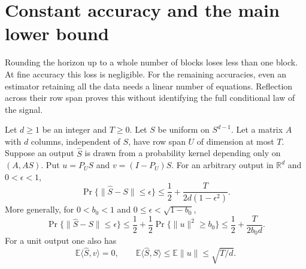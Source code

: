 \section{Constant accuracy and the main lower bound}\label{h:end:section}

Rounding the horizon up to a whole number of blocks loses less than one
block. At fine accuracy this loss is negligible. For the remaining
accuracies, even an estimator retaining all the data needs a linear
number of equations. Reflection across their row span proves this
without identifying the full conditional law of the signal.

\begin{lemma}
\label{h:ev:reflection}
Let \(d\ge1\) be an integer and \(T\ge0\). Let \(S\) be uniform on
\(S^{d-1}\). Let a matrix \(A\) with \(d\) columns, independent of
\(S\), have row span \(U\) of dimension at most \(T\). Suppose an
output \(\widehat S\) is drawn from a probability kernel depending
only on \((A,AS)\). Put \(u=P_US\) and \(v=(I-P_U)S\).
For an arbitrary output in \(\mathbb R^d\) and \(0<\epsilon<1\),
\begin{equation}\label{h:ev:direct-residual}
 \Pr\{\|\widehat S-S\|\le\epsilon\}
 \le\frac12+\frac{T}{2d(1-\epsilon^2)}.
\end{equation}
More generally, for \(0<b_0<1\) and
\(0\le\epsilon<\sqrt{1-b_0}\),
\begin{equation}\label{h:ev:antipodal}
 \Pr\{\|\widehat S-S\|\le\epsilon\}
 \le\frac12+\frac12\Pr\{\|u\|^2\ge b_0\}
 \le\frac12+\frac{T}{2b_0d}.
\end{equation}
For a unit output one also has
\begin{equation}\label{h:ev:reflection-expectation}
 \mathbb E\langle\widehat S,v\rangle=0,\qquad
 \mathbb E\langle\widehat S,S\rangle
 \le\mathbb E\|u\|\le\sqrt{T/d}.
\end{equation}
\end{lemma}


